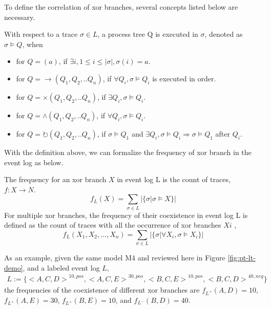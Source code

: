 To define the correlation of xor branches, several concepts listed below are necessary. 
\begin{definition}
	With respect to a trace $\sigma \in L$, a process tree Q is executed in $\sigma$, denoted as $\sigma \models Q$, when
		\begin{itemize}
		\item for $Q=(a)$, if $\exists i, 1 \leq i \leq |\sigma|, \sigma(i)=a$.
		\item for $Q= \rightarrow(Q_1 , Q_2 ,.. Q_n)$, if $\forall Q_i, \sigma \models Q_i$ is executed in order.
		\item for $Q= \times(Q_1 , Q_2 ,.. Q_n)$,  if $\exists Q_i, \sigma \models Q_i$.
		\item for $Q= \land (Q_1 , Q_2 ,.. Q_n)$, if $\forall Q_i, \sigma \models Q_i$.
		\item for $Q= \circlearrowright(Q_1 , Q_2 ,.. Q_n)$,  if $ \sigma \models Q_1$ and $\exists Q_i, \sigma \models Q_i \Rightarrow  \sigma \models Q_1$ after $Q_i$.
	\end{itemize} 
\end{definition}
With the definition above, we can formalize the frequency of xor branch in the event log as below.
\begin{definition}
	The frequency for an xor branch $X$ in event log L is the count of traces, $f: X \rightarrow N$.   
	\[f_{L}(X) = \sum_{\sigma \in L} |\{\sigma \vert \sigma \models X\} |\]
	For multiple xor branches, the frequency of their coexistence in event log L is defined as the count of traces with all the occurrence of xor branches ${Xi}$ , \[f_{L}(X_1, X_2,...,X_n)= \sum_{\sigma \in L} |\{\sigma \vert \forall X_i, \sigma \models X_i\} | \]
\end{definition}
As an example, given the same model M4 and reviewed here in Figure \ref{fig:pt-lt-demo}, and a labeled event log $L$,
\begin{align*}
L:= \{  {<A,C,D>}^{10, pos}, {<A,C,E>}^{30,pos}, {<B,C,E>}^{10,pos}, {<B,C,D>}^{40, neg}\}
\end{align*} the frequencies of the coexistence of different xor branches are
$f_{L^+}(A, D)=10$, $f_{L^+}(A, E)=30$, $f_{L^+}(B, E)=10$, and $f_{L^-}(B, D)=40$.

